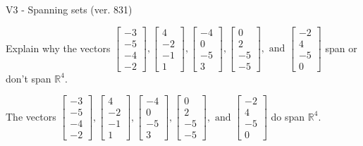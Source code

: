 \begin{exercise}
  \begin{exerciseTitle}V3 - Spanning sets (ver. 831)\end{exerciseTitle}
  \begin{exerciseStatement}
    Explain why the vectors \(\left[\begin{array}{r}
-3 \\
-5 \\
-4 \\
-2
\end{array}\right] , \left[\begin{array}{r}
4 \\
-2 \\
-1 \\
1
\end{array}\right] , \left[\begin{array}{r}
-4 \\
0 \\
-5 \\
3
\end{array}\right] , \left[\begin{array}{r}
0 \\
2 \\
-5 \\
-5
\end{array}\right] , \text{ and } \left[\begin{array}{r}
-2 \\
4 \\
-5 \\
0
\end{array}\right]\) span or don't span \(\mathbb{R}^4\). 
	


  \end{exerciseStatement}
  \begin{exerciseAnswer}
   The vectors \(\left[\begin{array}{r}
-3 \\
-5 \\
-4 \\
-2
\end{array}\right] , \left[\begin{array}{r}
4 \\
-2 \\
-1 \\
1
\end{array}\right] , \left[\begin{array}{r}
-4 \\
0 \\
-5 \\
3
\end{array}\right] , \left[\begin{array}{r}
0 \\
2 \\
-5 \\
-5
\end{array}\right] , \text{ and } \left[\begin{array}{r}
-2 \\
4 \\
-5 \\
0
\end{array}\right]\) 
  	 do  
	span \(\mathbb{R}^4\).
  



\end{exerciseAnswer}
\end{exercise}
